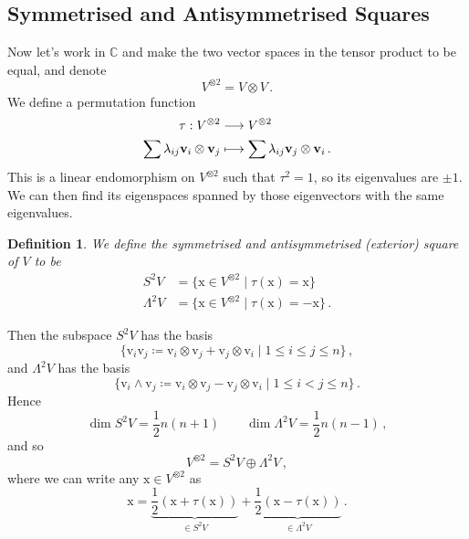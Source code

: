 \documentclass{article}
\theoremstyle{plain}\theoremheaderfont{\normalfont\itshape}\theorembodyfont{\rmfamily}\theoremseparator{.}\newtheorem*{rem}{Remark}\newtheorem*{ex}{Example}\newtheorem*{proof}{Proof}\newtheorem*{altp}{Alternative proof}
\theoremstyle{plain}\theoremheaderfont{\normalfont\bfseries}\theorembodyfont{\rmfamily}\theoremseparator{.}\newtheorem{thm}{Theorem}[section]\newtheorem{lem}[thm]{Lemma}\newtheorem{prop}[thm]{Proposition}\newtheorem*{cor}{Corollary}\newtheorem{defn}[thm]{Definition}\newtheorem{clm}[thm]{Claim}\newtheorem{clminproof}{Claim}\newtheorem*{law}{Law}\newtheorem{pos}[thm]{Postulate}
\theoremstyle{break}\theoremheaderfont{\normalfont\itshape}\theorembodyfont{\rmfamily}\theoremseparator{.\medskip}\newtheorem*{proofskip}{Proof}\newtheorem*{exs}{Examples}\newtheorem*{rems}{Remarks}
\theoremstyle{break}\theoremheaderfont{\normalfont\bfseries}\theorembodyfont{\rmfamily}\theoremseparator{.\medskip}\newtheorem{lemskip}[thm]{Lemma}\newtheorem{defnskip}[thm]{Definition}\newtheorem{propskip}[thm]{Proposition}\newtheorem{thmskip}[thm]{Theorem}
\numberwithin{equation}{section}
\newcommand{\vb}[1]{\bm{\mathrm{#1}}}
\newcommand{\CC}{\mathbb{C}}
\begin{document}
    \subsection{Symmetrised and Antisymmetrised Squares}
    Now let's work in \(\CC\) and make the two vector spaces in the tensor product to be equal, and denote
    \begin{equation}
        V^{\otimes 2}=V\otimes V\,.
    \end{equation}
    We define a permutation function
    \begin{align}
        \tau:V^{\otimes 2}&\longrightarrow V^{\otimes 2}\notag \\
        \sum\lambda_{ij}\vb{v}_i\otimes \vb{v}_j&\longmapsto \sum\lambda_{ij}\vb{v}_j\otimes \vb{v}_i\,.
    \end{align}
    This is a linear endomorphism on \(V^{\otimes 2}\) such that \(\tau^2=1\), so its eigenvalues are \(\pm 1\). We can then find its eigenspaces spanned by those eigenvectors with the same eigenvalues.
    \begin{defn}
        We define the \textit{symmetrised} and \textit{antisymmetrised (exterior) square} of \(V\) to be
        \begin{align}
            S^2V &= \{\vb{x}\in V^{\otimes 2}\mid \tau(\vb{x})=\vb{x}\}\\
            \Lambda^2 V &= \{\vb{x}\in V^{\otimes 2}\mid \tau(\vb{x})=-\vb{x}\}\,.
        \end{align}
    \end{defn}

    Then the subspace \(S^2V\) has the basis
    \begin{equation}
        \{\vb{v}_i\vb{v}_j\coloneqq \vb{v}_i\otimes\vb{v}_j+\vb{v}_j\otimes\vb{v}_i \mid 1\le i\le j\le n\}\,,
    \end{equation}
    and \(\Lambda^2V\) has the basis
    \begin{equation}
        \{\vb{v}_i\wedge\vb{v}_j\coloneqq \vb{v}_i\otimes\vb{v}_j-\vb{v}_j\otimes\vb{v}_i \mid 1\le i< j\le n\}\,.
    \end{equation}
    Hence
    \begin{equation}
        \dim S^2V=\frac{1}{2}n(n+1)\qquad\dim\Lambda^2V=\frac{1}{2}n(n-1)\,,
    \end{equation}
    and so
    \begin{equation}
        V^{\otimes 2}=S^2V\oplus\Lambda^2V\,,
    \end{equation}
    where we can write any \(\vb{x}\in V^{\otimes 2}\) as
    \begin{equation}
        \vb{x}=\underbrace{\frac{1}{2}(\vb{x}+\tau(\vb{x}))}_{\in S^2 V}+\underbrace{\frac{1}{2}(\vb{x}-\tau(\vb{x}))}_{\in \Lambda^2 V}\,.
    \end{equation}
\end{document}
